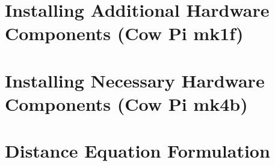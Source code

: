 
    \newpage

    \section{Installing Additional Hardware Components (Cow Pi mk1f)} \label{sec:hardwareMods-mk1f}   

    \newpage

    \section{Installing Necessary Hardware Components (Cow Pi mk4b)} \label{sec:hardwareMods-mk4b}   

    \newpage

    \section{Distance Equation Formulation} \label{sec:distanceFormulation}                         


